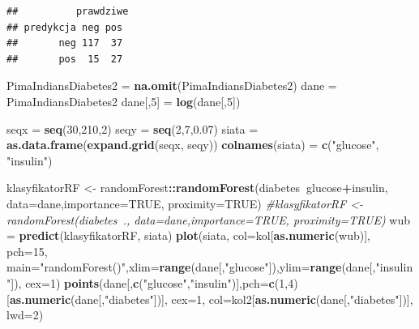 \documentclass[polish,]{book}
\newenvironment{Shaded}{\begin{snugshade}}{\end{snugshade}}
\newcommand{\CommentTok}[1]{\textcolor[rgb]{0.56,0.35,0.01}{\textit{#1}}}
\newcommand{\DataTypeTok}[1]{\textcolor[rgb]{0.13,0.29,0.53}{#1}}
\newcommand{\DecValTok}[1]{\textcolor[rgb]{0.00,0.00,0.81}{#1}}
\newcommand{\FloatTok}[1]{\textcolor[rgb]{0.00,0.00,0.81}{#1}}
\newcommand{\KeywordTok}[1]{\textcolor[rgb]{0.13,0.29,0.53}{\textbf{#1}}}
\newcommand{\NormalTok}[1]{#1}
\newcommand{\OperatorTok}[1]{\textcolor[rgb]{0.81,0.36,0.00}{\textbf{#1}}}
\newcommand{\OtherTok}[1]{\textcolor[rgb]{0.56,0.35,0.01}{#1}}
\newcommand{\StringTok}[1]{\textcolor[rgb]{0.31,0.60,0.02}{#1}}
\begin{document}
\begin{verbatim}
##          prawdziwe
## predykcja neg pos
##       neg 117  37
##       pos  15  27
\end{verbatim}

\begin{Shaded}
\begin{Highlighting}[]
\NormalTok{PimaIndiansDiabetes2 =}\StringTok{ }\KeywordTok{na.omit}\NormalTok{(PimaIndiansDiabetes2)}
\NormalTok{dane =}\StringTok{ }\NormalTok{PimaIndiansDiabetes2}
\NormalTok{dane[,}\DecValTok{5}\NormalTok{] =}\StringTok{ }\KeywordTok{log}\NormalTok{(dane[,}\DecValTok{5}\NormalTok{])}

\NormalTok{seqx =}\StringTok{ }\KeywordTok{seq}\NormalTok{(}\DecValTok{30}\NormalTok{,}\DecValTok{210}\NormalTok{,}\DecValTok{2}\NormalTok{)}
\NormalTok{seqy =}\StringTok{ }\KeywordTok{seq}\NormalTok{(}\DecValTok{2}\NormalTok{,}\DecValTok{7}\NormalTok{,}\FloatTok{0.07}\NormalTok{)}
\NormalTok{siata =}\StringTok{ }\KeywordTok{as.data.frame}\NormalTok{(}\KeywordTok{expand.grid}\NormalTok{(seqx, seqy))}
\KeywordTok{colnames}\NormalTok{(siata) =}\StringTok{ }\KeywordTok{c}\NormalTok{(}\StringTok{"glucose"}\NormalTok{, }\StringTok{"insulin"}\NormalTok{)}

\NormalTok{klasyfikatorRF <-}\StringTok{ }\NormalTok{randomForest}\OperatorTok{::}\KeywordTok{randomForest}\NormalTok{(diabetes}\OperatorTok{~}\NormalTok{glucose}\OperatorTok{+}\NormalTok{insulin,}
                                             \DataTypeTok{data=}\NormalTok{dane,}\DataTypeTok{importance=}\OtherTok{TRUE}\NormalTok{, }\DataTypeTok{proximity=}\OtherTok{TRUE}\NormalTok{)}
\CommentTok{#klasyfikatorRF <- randomForest(diabetes~., data=dane,importance=TRUE, proximity=TRUE)}
\NormalTok{wub =}\StringTok{ }\KeywordTok{predict}\NormalTok{(klasyfikatorRF, siata)}
\KeywordTok{plot}\NormalTok{(siata, }\DataTypeTok{col=}\NormalTok{kol[}\KeywordTok{as.numeric}\NormalTok{(wub)], }\DataTypeTok{pch=}\DecValTok{15}\NormalTok{, }
     \DataTypeTok{main=}\StringTok{"randomForest()"}\NormalTok{,}\DataTypeTok{xlim=}\KeywordTok{range}\NormalTok{(dane[,}\StringTok{"glucose"}\NormalTok{]),}\DataTypeTok{ylim=}\KeywordTok{range}\NormalTok{(dane[,}\StringTok{"insulin"}\NormalTok{]),}
     \DataTypeTok{cex=}\DecValTok{1}\NormalTok{)}
\KeywordTok{points}\NormalTok{(dane[,}\KeywordTok{c}\NormalTok{(}\StringTok{"glucose"}\NormalTok{,}\StringTok{"insulin"}\NormalTok{)],}\DataTypeTok{pch=}\KeywordTok{c}\NormalTok{(}\DecValTok{1}\NormalTok{,}\DecValTok{4}\NormalTok{)[}\KeywordTok{as.numeric}\NormalTok{(dane[,}\StringTok{"diabetes"}\NormalTok{])], }
       \DataTypeTok{cex=}\DecValTok{1}\NormalTok{, }\DataTypeTok{col=}\NormalTok{kol2[}\KeywordTok{as.numeric}\NormalTok{(dane[,}\StringTok{"diabetes"}\NormalTok{])], }\DataTypeTok{lwd=}\DecValTok{2}\NormalTok{)}
\end{Highlighting}
\end{Shaded}
\end{document}
